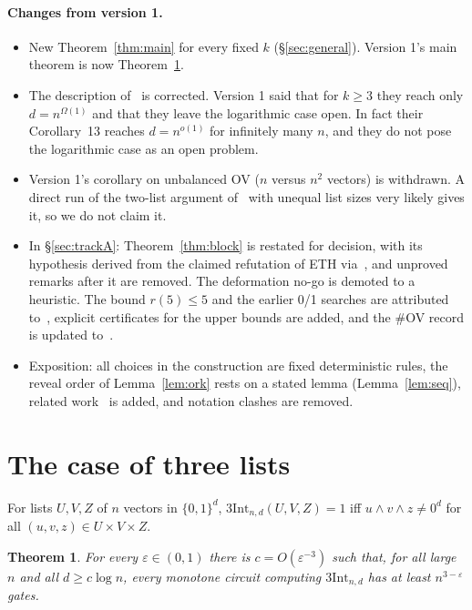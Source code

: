 \documentclass[11pt,a4paper]{article}
\theoremstyle{plain}
\newtheorem{theorem}{Theorem}
\theoremstyle{definition}
\theoremstyle{remark}
\newcommand{\tInt}{3\mathrm{Int}}
\begin{document}
\paragraph{Changes from version 1.}
\begin{itemize}
  \item New Theorem~\ref{thm:main} for every fixed $k$ (\S\ref{sec:general}). Version 1's main theorem is now
    Theorem~\ref{thm:three}.
  \item The description of~\cite{CLSS26} is corrected. Version 1 said that for $k\ge3$ they reach only
    $d=n^{\Omega(1)}$ and that they leave the logarithmic case open. In fact their Corollary~13 reaches $d=n^{o(1)}$
    for infinitely many $n$, and they do not pose the logarithmic case as an open problem.
  \item Version 1's corollary on unbalanced OV ($n$ versus $n^2$ vectors) is withdrawn. A direct run of the
    two-list argument of~\cite{CLSS26} with unequal list sizes very likely gives it, so we do not claim it.
  \item In \S\ref{sec:trackA}: Theorem~\ref{thm:block} is restated for decision, with its hypothesis derived from the
    claimed refutation of ETH via~\cite{IPZ01}, and unproved remarks after it are removed. The deformation no-go is
    demoted to a heuristic. The bound $r(5)\le5$ and the earlier 0/1 searches are attributed to~\cite{Wil24}, explicit
    certificates for the upper bounds are added, and the \#OV record is updated to~\cite{Ye26}.
  \item Exposition: all choices in the construction are fixed deterministic rules, the reveal order of
    Lemma~\ref{lem:ork} rests on a stated lemma (Lemma~\ref{lem:seq}), related work~\cite{Lin26} is added, and
    notation clashes are removed.
\end{itemize}

\section{The case of three lists}\label{sec:main}

For lists $U,V,Z$ of $n$ vectors in $\{0,1\}^d$, $\tInt_{n,d}(U,V,Z)=1$ iff $u\wedge v\wedge z\ne0^d$ for all
$(u,v,z)\in U\times V\times Z$.

\begin{theorem}\label{thm:three}
For every $\varepsilon\in(0,1)$ there is $c=O(\varepsilon^{-3})$ such that, for all large $n$ and all $d\ge c\log n$,
every monotone circuit computing $\tInt_{n,d}$ has at least $n^{3-\varepsilon}$ gates.
\end{theorem}
\end{document}
